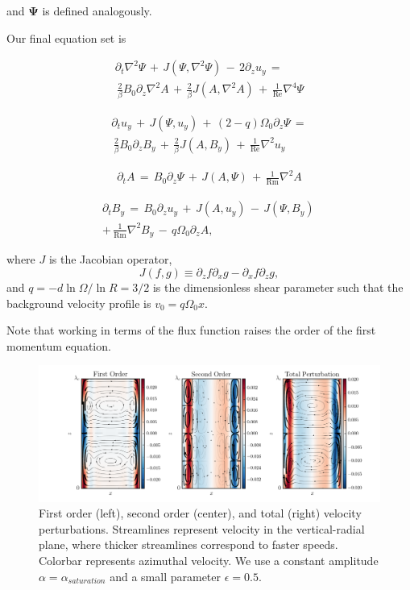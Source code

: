 \documentclass{emulateapj}
\newcommand{\beq}{\begin{equation}}
\newcommand{\eeq}{\end{equation}}
\newcommand\reye{\mathrm{Re}}
\newcommand\reym{\mathrm{Rm}}
\begin{document}
and $\mathbf{\Psi}$ is defined analogously.

Our final equation set is

\begin{multline}
\label{eqset1}
\partial_t \nabla^2 \Psi \, + \, J\left(\Psi, \nabla^2 \Psi\right) \, - \, 2 \partial_z u_{y} \, = \\
\, \frac{2}{\beta} B_0 \partial_z \nabla^2 A \, + \, \frac{2}{\beta}J\left(A, \nabla^2 A \right) \, + \, \frac{1}{\reye}\nabla^4 \Psi
\end{multline}

\begin{multline}
\label{eqset2}
\partial_t u_{y} \, + \, J\left(\Psi, u_{y}\right) \, + \, \left(2 - q\right) \Omega_0 \partial_z \Psi \, = \\
\, \frac{2}{\beta}B_0\partial_z B_{y} \, + \, \frac{2}{\beta} J\left(A, B_{y}\right) \, + \, \frac{1}{\reye} \nabla^2 u_{y}
\end{multline}

\begin{multline}
\label{eqset3}
\partial_t A \, = \, B_0 \partial_z \Psi \, + \, J\left(A, \Psi\right) \, + \, \frac{1}{\reym} \nabla^2 A
\end{multline}

\begin{multline}
\label{eqset4}
\partial_t B_{y} \, = \, B_0 \partial_z u_{y} \, + \, J\left(A, u_{y}\right) \, - \, J\left(\Psi, B_{y}\right) \, \\
+ \, \frac{1}{\reym} \nabla^2 B_{y}  \, - \, q \Omega_0 \partial_z A,
\end{multline}

where $J$ is the Jacobian operator, 
\beq
J\left(f, g\right) \equiv \partial_z f\partial_x g - \partial_x f \partial_z g,
\eeq  
and $q = - d \ln \Omega/ \ln R = 3/2$ is the dimensionless shear parameter such that the background velocity profile is $v_0 = q \Omega_0 x$.

Note that working in terms of the flux function raises the order of the first momentum equation.

\begin{figure}
\centering
\includegraphics[width=\textwidth]{../figures/thingap_streamfuncs_velocity_Pm_1E-3.png}
\caption{First order (left), second order (center), and total (right) velocity perturbations. Streamlines represent velocity in the vertical-radial plane, where thicker streamlines correspond to faster speeds. Colorbar represents azimuthal velocity. We use a constant amplitude $\alpha = \alpha_{saturation}$ and a small parameter $\epsilon = 0.5$.}\label{fig:allorders_velocity}
\end{figure}
\end{document}
